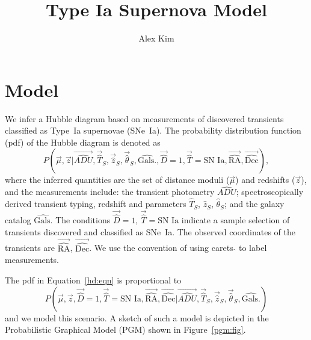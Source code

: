 \documentclass[preprint]{aastex}
\begin{document}
\title{Type Ia Supernova Model}
\author{Alex Kim}

\section{Model}
We infer a Hubble diagram based on measurements of discovered transients
classified as Type~Ia supernovae (SNe~Ia).  The probability distribution
function (pdf) of the Hubble diagram is denoted as
\begin{equation}
P(\vec{\mu},\vec{z} |  \vec{\hat{ADU}}, \vec{\hat{T}}_S,\vec{\hat{z}}_S,
\vec{\hat{\theta}}_S,\hat{\text{Gals.}}, \vec{\hat{D}}=1, \vec{\hat{T}}=\text{SN~Ia},
\vec{\hat{\text{RA}}}, \vec{\hat{\text{Dec}}}),
\label{hd:eqn}
\end{equation}
where the inferred quantities are the set of distance moduli ($\vec{\mu}$)
and redshifts ($\vec{z}$), and 
the measurements include:  the transient photometry $\hat{ADU}$;
spectroscopically derived transient
typing, redshift and parameters $\hat{T}_S$, $\hat{z}_S$, $\hat{\theta}_S$;
and the galaxy catalog $\hat{\text{Gals.}}$
The conditions $\vec{\hat{D}}=1$, $\vec{\hat{T}}=\text{SN~Ia}$ indicate a sample selection
of transients
discovered and classified as SNe~Ia. The observed coordinates of the transients
are $\vec{\hat{\text{RA}}}$, $\vec{\hat{\text{Dec}}}$.
We use the convention of using carets $\hat{}$
to  label measurements.

The pdf in Equation~\ref{hd:eqn} is proportional to
\begin{equation}
P(\vec{\mu},\vec{z},  \vec{\hat{D}}=1, \vec{\hat{T}}=\text{SN~Ia},
\vec{\hat{\text{RA}}}, \vec{\hat{\text{Dec}}} |  \vec{\hat{ADU}}, \vec{\hat{T}}_S,\vec{\hat{z}}_S,
\vec{\hat{\theta}}_S,\hat{\text{Gals.}})
\label{hd2:eqn}
\end{equation}
and we model this scenario.  A sketch of such a model is depicted in the Probabilistic Graphical Model
(PGM)
shown in Figure~\ref{pgm:fig}.
\end{document}
